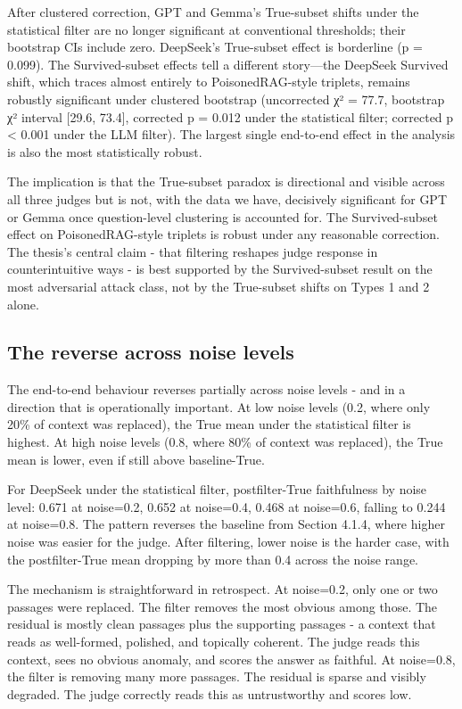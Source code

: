 After clustered correction, GPT and Gemma's True-subset shifts under the statistical filter are no longer significant at conventional thresholds; their bootstrap CIs include zero. DeepSeek's True-subset effect is borderline (p = 0.099). The Survived-subset effects tell a different story---the DeepSeek Survived shift, which traces almost entirely to PoisonedRAG-style triplets, remains robustly significant under clustered bootstrap (uncorrected χ² = 77.7, bootstrap χ² interval [29.6, 73.4], corrected p = 0.012 under the statistical filter; corrected p < 0.001 under the LLM filter). The largest single end-to-end effect in the analysis is also the most statistically robust.

The implication is that the True-subset paradox is directional and visible across all three judges but is not, with the data we have, decisively significant for GPT or Gemma once question-level clustering is accounted for. The Survived-subset effect on PoisonedRAG-style triplets is robust under any reasonable correction. The thesis's central claim - that filtering reshapes judge response in counterintuitive ways - is best supported by the Survived-subset result on the most adversarial attack class, not by the True-subset shifts on Types 1 and 2 alone.

\subsection{The reverse across noise levels}

The end-to-end behaviour reverses partially across noise levels - and in a direction that is operationally important. At low noise levels (0.2, where only 20\% of context was replaced), the True mean under the statistical filter is highest. At high noise levels (0.8, where 80\% of context was replaced), the True mean is lower, even if still above baseline-True.

For DeepSeek under the statistical filter, postfilter-True faithfulness by noise level: 0.671 at noise=0.2, 0.652 at noise=0.4, 0.468 at noise=0.6, falling to 0.244 at noise=0.8. The pattern reverses the baseline from Section 4.1.4, where higher noise was easier for the judge. After filtering, lower noise is the harder case, with the postfilter-True mean dropping by more than 0.4 across the noise range.

The mechanism is straightforward in retrospect. At noise=0.2, only one or two passages were replaced. The filter removes the most obvious among those. The residual is mostly clean passages plus the supporting passages - a context that reads as well-formed, polished, and topically coherent. The judge reads this context, sees no obvious anomaly, and scores the answer as faithful. At noise=0.8, the filter is removing many more passages. The residual is sparse and visibly degraded. The judge correctly reads this as untrustworthy and scores low.

